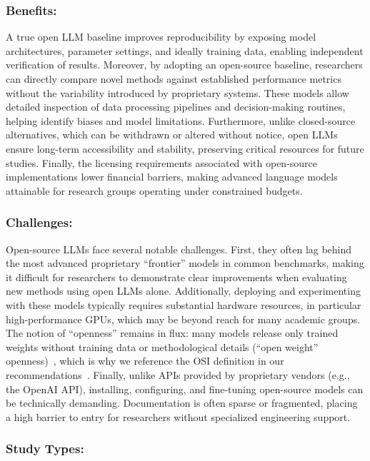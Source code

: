 \documentclass[smallextended]{svjour3}
\newcommand{\guidelinesubsubsection}[1]{\subsubsection{\bfseries #1:}}
\newcommand{\guidelinesubsubsection}[1]{\subsubsection{#1}}
\begin{document}
\guidelinesubsubsection{Benefits}

A true open LLM baseline improves reproducibility by exposing model architectures, parameter settings, and ideally training data, enabling independent verification of results.
Moreover, by adopting an open-source baseline, researchers can directly compare novel methods against established performance metrics without the variability introduced by proprietary systems.
These models allow detailed inspection of data processing pipelines and decision-making routines, helping identify biases and model limitations.
Furthermore, unlike closed-source alternatives, which can be withdrawn or altered without notice, open LLMs ensure long-term accessibility and stability, preserving critical resources for future studies.
Finally, the licensing requirements associated with open-source implementations lower financial barriers, making advanced language models attainable for research groups operating under constrained budgets.

\guidelinesubsubsection{Challenges}

Open-source LLMs face several notable challenges.
First, they often lag behind the most advanced proprietary ``frontier'' models in common benchmarks, making it difficult for researchers to demonstrate clear improvements when evaluating new methods using open LLMs alone.
Additionally, deploying and experimenting with these models typically requires substantial hardware resources, in particular high-performance GPUs, which may be beyond reach for many academic groups.
The notion of ``openness'' remains in flux: many models release only trained weights without training data or methodological details (``open weight'' openness)~\cite{Gibney2024}, which is why we reference the OSI definition in our recommendations~\cite{OSIAI2024}.
Finally, unlike APIs provided by proprietary vendors (e.g., the OpenAI API), installing, configuring, and fine-tuning open-source models can be technically demanding.
Documentation is often sparse or fragmented, placing a high barrier to entry for researchers without specialized engineering support.

\guidelinesubsubsection{Study Types}
\end{document}
